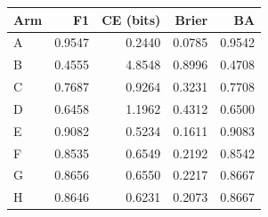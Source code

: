 \begin{tabular}{lrrrr}
\toprule
Arm & F1 & CE (bits) & Brier & BA \\
\midrule
A & 0.9547 & 0.2440 & 0.0785 & 0.9542 \\
B & 0.4555 & 4.8548 & 0.8996 & 0.4708 \\
C & 0.7687 & 0.9264 & 0.3231 & 0.7708 \\
D & 0.6458 & 1.1962 & 0.4312 & 0.6500 \\
E & 0.9082 & 0.5234 & 0.1611 & 0.9083 \\
F & 0.8535 & 0.6549 & 0.2192 & 0.8542 \\
G & 0.8656 & 0.6550 & 0.2217 & 0.8667 \\
H & 0.8646 & 0.6231 & 0.2073 & 0.8667 \\
\bottomrule
\end{tabular}
